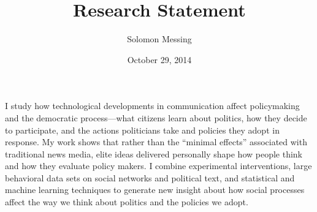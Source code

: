 \documentclass[12pt]{article}
\begin{document}
  
\title{Research Statement}
\author{Solomon Messing}
\date{October 29, 2014}
\maketitle 




%
%

I study how technological developments in communication affect policymaking and the democratic process---what citizens learn about politics, how they decide to participate, and the actions politicians take and policies they adopt in response.  My work shows that rather than the ``minimal effects'' associated with traditional news media, elite ideas delivered personally shape how people think and how they evaluate policy makers.  I combine experimental interventions, large behavioral data sets on social networks and political text, and statistical and machine learning techniques to generate new insight about how social processes affect the way we think about politics and the policies we adopt.  %
\end{document}
